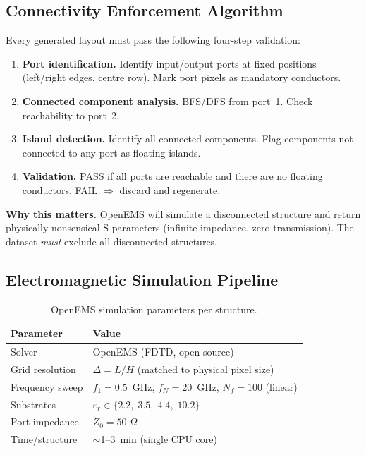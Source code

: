 \documentclass[12pt,a4paper]{article}
\newcommand{\NOTE}[1]{\begin{tcolorbox}[notebox]#1\end{tcolorbox}}
\theoremstyle{definition}
\theoremstyle{plain}
\theoremstyle{remark}
\begin{document}
\subsection{Connectivity Enforcement Algorithm}

Every generated layout must pass the following four-step validation:

\begin{enumerate}
  \item \textbf{Port identification.} Identify input/output ports at fixed positions
        (left/right edges, centre row). Mark port pixels as mandatory conductors.
  \item \textbf{Connected component analysis.} BFS/DFS from port~1.
        Check reachability to port~2.
  \item \textbf{Island detection.} Identify all connected components.
        Flag components not connected to any port as floating islands.
  \item \textbf{Validation.}
        PASS if all ports are reachable and there are no floating conductors.
        FAIL $\Rightarrow$ discard and regenerate.
\end{enumerate}

\NOTE{\textbf{Why this matters.}
OpenEMS will simulate a disconnected structure and return physically nonsensical
S-parameters (infinite impedance, zero transmission).
The dataset \emph{must} exclude all disconnected structures.}

\subsection{Electromagnetic Simulation Pipeline}

\begin{table}[H]
\centering
\caption{OpenEMS simulation parameters per structure.}
\label{tab:sim_params}
\begin{tabular}{ll}
\toprule
\textbf{Parameter} & \textbf{Value} \\
\midrule
Solver         & OpenEMS (FDTD, open-source) \\
Grid resolution & $\Delta = L/H$ (matched to physical pixel size) \\
Frequency sweep & $f_1 = 0.5$~GHz, $f_N = 20$~GHz, $N_f = 100$ (linear) \\
Substrates      & $\varepsilon_r \in \{2.2,\; 3.5,\; 4.4,\; 10.2\}$ \\
Port impedance  & $Z_0 = 50\;\Omega$ \\
Time/structure  & $\sim$1--3~min (single CPU core) \\
\bottomrule
\end{tabular}
\end{table}
\end{document}
